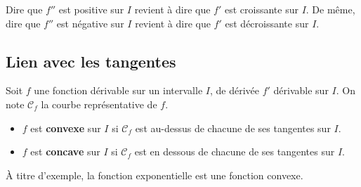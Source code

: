 	\begin{tip}
		Dire que $f''$ est positive sur $I$ revient à dire que $f'$ est croissante sur $I$. De même, dire que $f''$ est négative sur $I$ revient à dire que $f'$ est décroissante sur $I$.
	\end{tip}
	
	\subsection{Lien avec les tangentes}
	
	\begin{formula}
		Soit $f$ une fonction dérivable sur un intervalle $I$, de dérivée $f'$ dérivable sur $I$. On note $\mathcal{C}_f$ la courbe représentative de $f$.
		\begin{itemize}
			\item $f$ est \textbf{convexe} sur $I$ si $\mathcal{C}_f$ est au-dessus de chacune de ses tangentes sur $I$.
			\item $f$ est \textbf{concave} sur $I$ si $\mathcal{C}_f$ est en dessous de chacune de ses tangentes sur $I$.
		\end{itemize}
	\end{formula}
	
	
	\begin{tip}[Exemple]
		À titre d'exemple, la fonction exponentielle est une fonction convexe.
	\end{tip}
